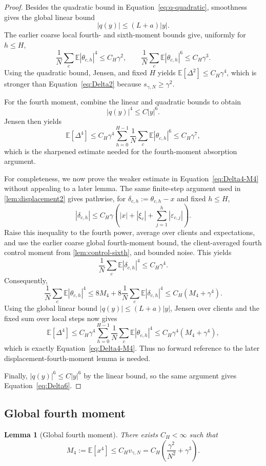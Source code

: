 \documentclass[11pt]{article}
\newtheorem{lemma}[lemma]{Lemma}
\theoremstyle{definition}
\newcommand{\E}{\mathbb{E}}
\newcommand{\smallscale}{s_{\gamma,N}}
\newcommand{\fourthscale}{v_{\gamma,N}}
\newcommand{\eps}{\varepsilon}
\newcommand{\delt}{\delta}
\begin{document}
\begin{proof}
Besides the quadratic bound in Equation~\eqref{eq:q-quadratic}, smoothness gives the global linear bound
\[
  |q(y)|\le (L+a)|y|.
\]
The earlier coarse local fourth- and sixth-moment bounds give, uniformly for $h\le H$,
\[
  \frac1N\sum_c\E|\theta_{c,h}|^4\le C_H\gamma^2,
  \qquad
  \frac1N\sum_c\E|\theta_{c,h}|^6\le C_H\gamma^3.
\]
Using the quadratic bound, Jensen, and fixed $H$ yields $\E[\Delta^2]\le C_H\gamma^4$, which is stronger than Equation~\eqref{eq:Delta2} because $\smallscale\ge\gamma^2$.

For the fourth moment, combine the linear and quadratic bounds to obtain
\[
  |q(y)|^4\le C|y|^6.
\]
Jensen then yields
\[
  \E[\Delta^4]\le C_H\gamma^4
  \sum_{h=0}^{H-1}\frac1N\sum_c\E|\theta_{c,h}|^6
  \le C_H\gamma^7,
\]
which is the sharpened estimate needed for the fourth-moment absorption argument.

For completeness, we now prove the weaker estimate in Equation~\eqref{eq:Delta4-M4} without appealing to a later lemma. The same finite-step argument used in \cref{lem:displacement2} gives pathwise, for $\delt_{c,h}:=\theta_{c,h}-x$ and fixed $h\le H$,
\[
  |\delt_{c,h}|
  \le C_H\gamma\left(|x|+|\xi_c|+\sum_{j=1}^h|\eps_{c,j}|\right).
\]
Raise this inequality to the fourth power, average over clients and expectations, and use the earlier coarse global fourth-moment bound, the client-averaged fourth control moment from \cref{lem:control-sixth}, and bounded noise. This yields
\[
  \frac1N\sum_c\E|\delt_{c,h}|^4\le C_H\gamma^4.
\]
Consequently,
\[
  \frac1N\sum_c\E|\theta_{c,h}|^4
  \le 8M_4+8\frac1N\sum_c\E|\delt_{c,h}|^4
  \le C_H(M_4+\gamma^4).
\]
Using the global linear bound $|q(y)|\le (L+a)|y|$, Jensen over clients and the fixed sum over local steps now gives
\[
  \E[\Delta^4]
  \le C_H\gamma^4\sum_{h=0}^{H-1}\frac1N\sum_c\E|\theta_{c,h}|^4
  \le C_H\gamma^4(M_4+\gamma^4),
\]
which is exactly Equation~\eqref{eq:Delta4-M4}. Thus no forward reference to the later displacement-fourth-moment lemma is needed.

Finally, $|q(y)|^6\le C|y|^6$ by the linear bound, so the same argument gives Equation~\eqref{eq:Delta6}.
\end{proof}

\subsection{Global fourth moment}

\begin{lemma}[Global fourth moment]
\label{lem:M4}
There exists $C_H<\infty$ such that
\begin{equation}
\label{eq:M4}
  M_4:=\E[x^4]\le C_H\fourthscale
  =C_H\left(\frac{\gamma^2}{N^2}+\gamma^3\right).
\end{equation}
\end{lemma}
\end{document}
